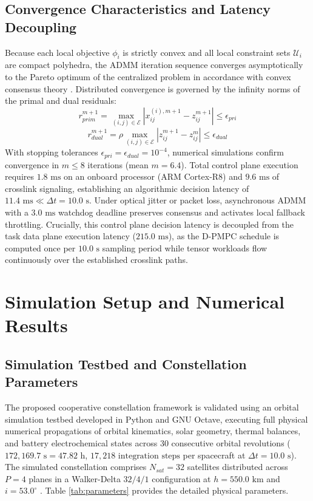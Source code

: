 \documentclass[journal]{IEEEtran}
\begin{document}
\subsection{Convergence Characteristics and Latency Decoupling}
Because each local objective $\phi_i$ is strictly convex and all local constraint sets $\mathcal{U}_i$ are compact polyhedra, the ADMM iteration sequence converges asymptotically to the Pareto optimum of the centralized problem in accordance with convex consensus theory \cite{boyd2011distributed, giselsson2014improved}. Distributed convergence is governed by the infinity norms of the primal and dual residuals:
\begin{equation}
    r_{prim}^{m+1} = \max_{(i,j) \in \mathcal{E}} \left|x_{ij}^{(i),m+1} - z_{ij}^{m+1}\right| \le \epsilon_{pri}
\end{equation}
\begin{equation}
    r_{dual}^{m+1} = \rho \max_{(i,j) \in \mathcal{E}} \left|z_{ij}^{m+1} - z_{ij}^m\right| \le \epsilon_{dual}
\end{equation}
With stopping tolerances $\epsilon_{pri} = \epsilon_{dual} = 10^{-4}$, numerical simulations confirm convergence in $m \le 8$ iterations (mean $m = 6.4$). Total control plane execution requires $1.8\text{ ms}$ on an onboard processor (ARM Cortex-R8) and $9.6\text{ ms}$ of crosslink signaling, establishing an algorithmic decision latency of $11.4\text{ ms} \ll \Delta t = 10.0\text{ s}$. Under optical jitter or packet loss, asynchronous ADMM with a $3.0\text{ ms}$ watchdog deadline preserves consensus and activates local fallback throttling. Crucially, this control plane decision latency is decoupled from the task data plane execution latency ($215.0\text{ ms}$), as the D-PMPC schedule is computed once per $10.0\text{ s}$ sampling period while tensor workloads flow continuously over the established crosslink paths.

\section{Simulation Setup and Numerical Results}

\subsection{Simulation Testbed and Constellation Parameters}
The proposed cooperative constellation framework is validated using an orbital simulation testbed developed in Python and GNU Octave, executing full physical numerical propagations of orbital kinematics, solar geometry, thermal balances, and battery electrochemical states across 30 consecutive orbital revolutions ($172,169.7\text{ s} = 47.82\text{ h}$, $17,218\text{ integration steps}$ per spacecraft at $\Delta t = 10.0\text{ s}$). The simulated constellation comprises $N_{sat} = 32$ satellites distributed across $P = 4$ planes in a Walker-Delta $32/4/1$ configuration at $h = 550.0\text{ km}$ and $i = 53.0^\circ$ \cite{walker1984satellite, curtis2014orbital}. Table \ref{tab:parameters} provides the detailed physical parameters.
\end{document}
